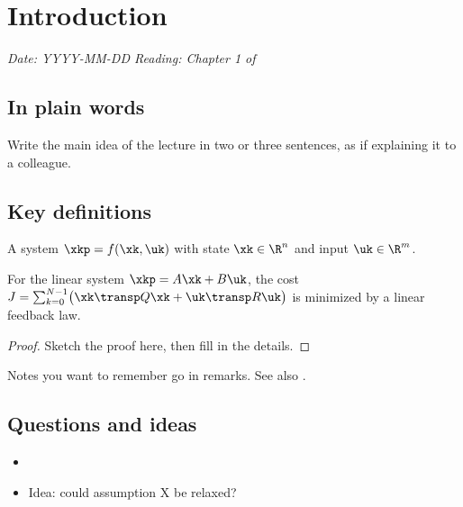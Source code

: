 \section{Introduction}\label{sec:intro}
\emph{Date: YYYY-MM-DD \quad Reading: Chapter 1 of \cite{rawlings2017}}

\subsection*{In plain words}
Write the main idea of the lecture in two or three sentences, as if
explaining it to a colleague.

\subsection{Key definitions}
\begin{definition}
A system $\xkp = f(\xk,\uk)$ with state $\xk\in\R^n$ and input $\uk\in\R^m$.
\end{definition}

\begin{theorem}\label{thm:example}
For the linear system $\xkp = A\xk + B\uk$, the cost
$J = \sum_{k=0}^{N-1}\bigl(\xk\transp Q\xk + \uk\transp R\uk\bigr)$
is minimized by a linear feedback law.
\end{theorem}
\begin{proof}
Sketch the proof here, then fill in the details.
\end{proof}

\begin{remark}
Notes you want to remember go in remarks. See also \cite{mayne2000}.
\end{remark}

\subsection{Questions and ideas}
\begin{itemize}
  \item {}
  \item Idea: could assumption X be relaxed?
\end{itemize}

